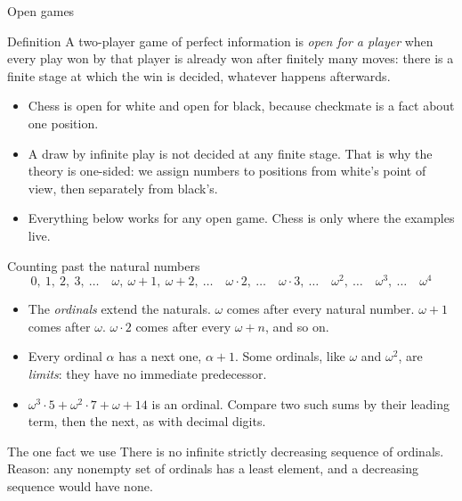 \documentclass[aspectratio=169,10pt]{beamer}
\begin{document}
\begin{frame}{Open games}
  \begin{block}{Definition}
    A two-player game of perfect information is \emph{open for a player} when every play won by that
    player is already won after finitely many moves: there is a finite stage at which the win is decided,
    whatever happens afterwards.
  \end{block}
  \vskip 0.3cm
  \begin{itemize}
    \item Chess is open for white and open for black, because checkmate is a fact about one position.
    \item A draw by infinite play is not decided at any finite stage. That is why the theory is one-sided:
      we assign numbers to positions from white's point of view, then separately from black's.
    \item Everything below works for any open game. Chess is only where the examples live.
  \end{itemize}
\end{frame}

\begin{frame}{Counting past the natural numbers}
  \[
    0,\ 1,\ 2,\ 3,\ \ldots\quad \omega,\ \omega+1,\ \omega+2,\ \ldots\quad
    \omega\cdot 2,\ \ldots\quad \omega\cdot 3,\ \ldots\quad \omega^2,\ \ldots\quad \omega^3,\ \ldots\quad \omega^4
  \]
  \begin{itemize}
    \item The \emph{ordinals} extend the naturals. $\omega$ comes after every natural number.
      $\omega+1$ comes after $\omega$. $\omega\cdot 2$ comes after every $\omega+n$, and so on.
    \item Every ordinal $\alpha$ has a next one, $\alpha+1$. Some ordinals, like $\omega$ and $\omega^2$, are
      \emph{limits}: they have no immediate predecessor.
    \item $\omega^3\cdot 5+\omega^2\cdot 7+\omega+14$ is an ordinal. Compare two such sums by their leading term,
      then the next, as with decimal digits.
  \end{itemize}
  \begin{alertblock}{The one fact we use}
    There is no infinite strictly decreasing sequence of ordinals.
    Reason: any nonempty set of ordinals has a least element, and a decreasing sequence would have none.
  \end{alertblock}
\end{frame}
\end{document}

